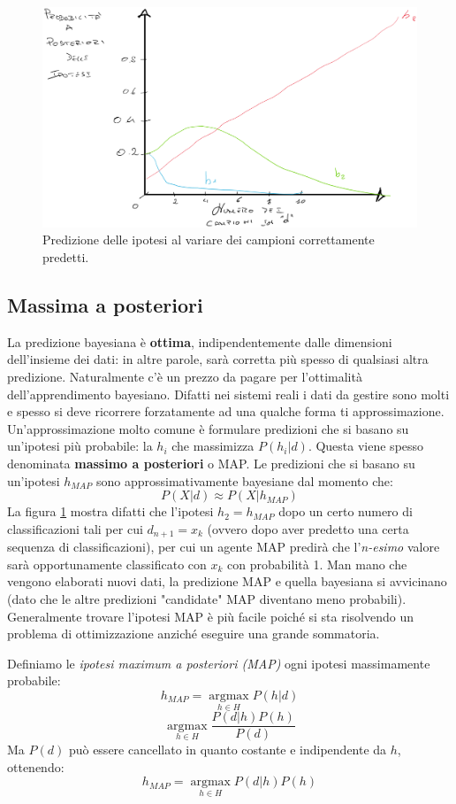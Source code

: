 \begin{figure}[H]
    \centering
    \includegraphics[width=1\textwidth]{img/prob1.png}
    \caption{Predizione delle ipotesi al variare dei campioni correttamente predetti.}
    \label{fig:Prob1}
\end{figure}
\subsection{Massima a posteriori}
La predizione bayesiana è \textbf{ottima}, indipendentemente dalle dimensioni dell'insieme dei dati: in altre parole, sarà corretta più spesso di qualsiasi altra predizione. Naturalmente c'è un prezzo da pagare per l'ottimalità dell'apprendimento bayesiano. Difatti nei sistemi reali i dati da gestire sono molti e spesso si deve ricorrere forzatamente ad una qualche forma ti approssimazione. \\ 
Un'approssimazione molto comune è formulare predizioni che si basano su un'ipotesi più probabile: la $h_i$ che massimizza $P(h_i| d)$. Questa viene spesso denominata \textbf{massimo a posteriori} o MAP. Le predizioni che si basano su un'ipotesi $h_{MAP}$ sono approssimativamente bayesiane dal momento che:
\[P(X|d) \approx P(X|h_{MAP})\]
La figura \ref{fig:Prob1} mostra difatti che l'ipotesi $h_2 = h_{MAP}$ dopo un certo numero di classificazioni tali per cui $d_{n+1} = x_k$ (ovvero dopo aver predetto una certa sequenza di classificazioni), per cui un agente MAP predirà che l'\textit{n-esimo} valore sarà opportunamente classificato con $x_k$ con probabilità 1. 
Man mano che vengono elaborati nuovi dati, la predizione MAP e quella bayesiana si avvicinano (dato che le altre predizioni "candidate" MAP diventano meno probabili). Generalmente trovare l'ipotesi MAP è più facile poiché si sta risolvendo un problema di ottimizzazione anziché eseguire una grande sommatoria.
\begin{definizione}
  Definiamo le \textit{ipotesi maximum a posteriori (MAP)} ogni ipotesi
  massimamente probabile:
  \[h_{MAP}=\operatorname*{argmax}_{h\in H}P(h|d)\]
  \[\operatorname*{argmax}_{h\in H}\frac{P(d|h)P(h)}{P(d)}\]
  Ma $P(d)$ può essere cancellato in quanto costante e indipendente da $h$,
  ottenendo:
  \[h_{MAP}=\operatorname*{argmax}_{h\in H}P(d|h)P(h)\]
\end{definizione}
